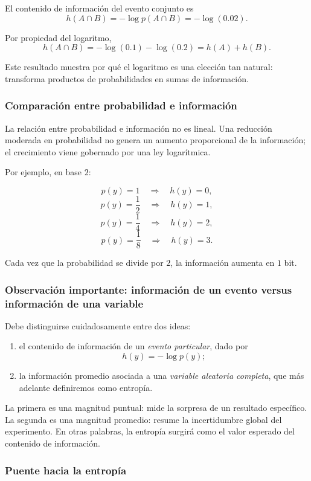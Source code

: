 \documentclass{article}
\begin{document}
El contenido de información del evento conjunto es
\[
h(A\cap B)=-\log p(A\cap B)=-\log(0.02).
\]

Por propiedad del logaritmo,
\[
h(A\cap B)=-\log(0.1)-\log(0.2)=h(A)+h(B).
\]

Este resultado muestra por qué el logaritmo es una elección tan natural: transforma productos de probabilidades en sumas de información.

\subsubsection*{Comparación entre probabilidad e información}

La relación entre probabilidad e información no es lineal. Una reducción moderada en probabilidad no genera un aumento proporcional de la información; el crecimiento viene gobernado por una ley logarítmica.

Por ejemplo, en base \(2\):

\[
p(y)=1 \quad \Rightarrow \quad h(y)=0,
\]
\[
p(y)=\frac{1}{2} \quad \Rightarrow \quad h(y)=1,
\]
\[
p(y)=\frac{1}{4} \quad \Rightarrow \quad h(y)=2,
\]
\[
p(y)=\frac{1}{8} \quad \Rightarrow \quad h(y)=3.
\]

Cada vez que la probabilidad se divide por \(2\), la información aumenta en \(1\) bit.

\subsubsection*{Observación importante: información de un evento versus información de una variable}

Debe distinguirse cuidadosamente entre dos ideas:

\begin{enumerate}
\item el contenido de información de un \emph{evento particular}, dado por
\[
h(y)=-\log p(y);
\]

\item la información promedio asociada a una \emph{variable aleatoria completa}, que más adelante definiremos como entropía.
\end{enumerate}

La primera es una magnitud puntual: mide la sorpresa de un resultado específico. La segunda es una magnitud promedio: resume la incertidumbre global del experimento. En otras palabras, la entropía surgirá como el valor esperado del contenido de información.

\subsubsection*{Puente hacia la entropía}
\end{document}
